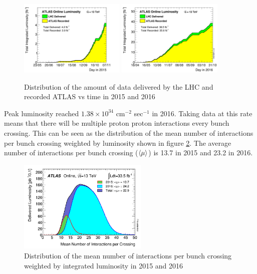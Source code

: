 \begin{figure}[htb]
  \begin{center}
    \includegraphics[width=0.45\textwidth]{figures/Data/IntLumi2015.png}\hspace{0.05\textwidth}
    \includegraphics[width=0.45\textwidth]{figures/Data/IntLumi2016.png}\hspace{0.05\textwidth}
\end{center}
\caption{Distribution of the amount of data delivered by the LHC and recorded ATLAS vs time in 2015 and 2016  }
\label{fig:data2015-2016} 
\end{figure}

\indent Peak luminosity reached $1.38 \times 10^{34}$  cm$^{-2}$ sec$^{-1}$ in 2016.  Taking data at this rate means that there will be multiple proton proton interactions every bunch crossing.  This can be seen as the distribution of the mean number of interactions per bunch crossing weighted by luminosity shown in figure \ref{fig:nVtx}.  The average number of interactions per bunch crossing ($\braket{\mu}$) is 13.7 in 2015 and 23.2 in 2016. \\

\begin{figure}[htb]
  \begin{center}
    \includegraphics[width=0.55\textwidth]{figures/Data/mu_2015_2016_LHCC.png}\hspace{0.05\textwidth}
\end{center}
\caption{Distribution of the mean number of interactions per bunch crossing weighted by integrated luminosity in 2015 and 2016  }
\label{fig:nVtx} 
\end{figure}

